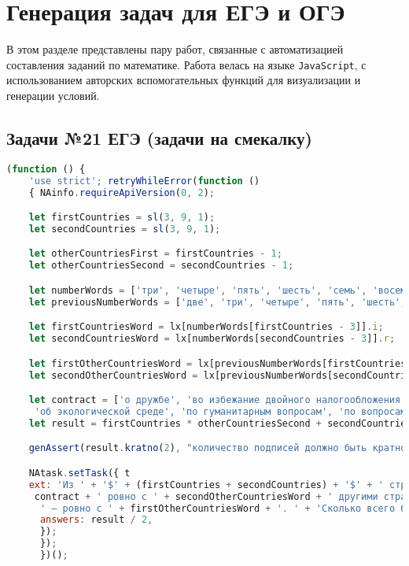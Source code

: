 \section{Генерация задач для ЕГЭ и ОГЭ}

В этом разделе представлены пару работ, связанные с автоматизацией составления заданий по математике. 
Работа велась на языке \texttt{JavaScript}, с использованием авторских вспомогательных функций для визуализации и генерации условий.

\subsection{Задачи №21 ЕГЭ (задачи на смекалку)}

\begin{lstlisting}[language=JavaScript]
(function () { 
    'use strict'; retryWhileError(function ()
    { NAinfo.requireApiVersion(0, 2);

    let firstCountries = sl(3, 9, 1);
    let secondCountries = sl(3, 9, 1);

    let otherCountriesFirst = firstCountries - 1;
    let otherCountriesSecond = secondCountries - 1;

    let numberWords = ['три', 'четыре', 'пять', 'шесть', 'семь', 'восемь', 'девять'];
    let previousNumberWords = ['две', 'три', 'четыре', 'пять', 'шесть', 'семь', 'восемь'];

    let firstCountriesWord = lx[numberWords[firstCountries - 3]].i; 
    let secondCountriesWord = lx[numberWords[secondCountries - 3]].r;

    let firstOtherCountriesWord = lx[previousNumberWords[firstCountries - 3]].t; 
    let secondOtherCountriesWord = lx[previousNumberWords[secondCountries - 3]].t; 

    let contract = ['о дружбе', 'во избежание двойного налогообложения', 'о безвизовом режиме',
     'об экологической среде', 'по гуманитарным вопросам', 'по вопросам безопасности'].iz();
    let result = firstCountries * otherCountriesSecond + secondCountries * otherCountriesFirst; 

    genAssert(result.kratno(2), "количество подписей должно быть кратно двум"); 

    NAtask.setTask({ t
    ext: 'Из ' + '$' + (firstCountries + secondCountries) + '$' + ' стран ' + firstCountriesWord + ' подписали договор ' +
     contract + ' ровно с ' + secondOtherCountriesWord + ' другими странами, ' + 'а каждая из оставшихся ' + secondCountriesWord +
      ' — ровно с ' + firstOtherCountriesWord + '. ' + 'Сколько всего было подписано договоров?', 
      answers: result / 2, 
      }); 
      }); 
      })();
\end{lstlisting}

